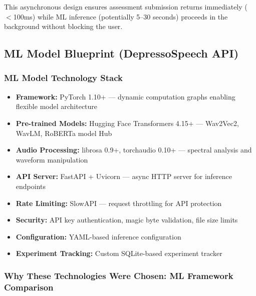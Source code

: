 \documentclass[12pt]{article}
\begin{document}
	This asynchronous design ensures assessment submission returns immediately ($<$100ms) while ML inference (potentially 5--30 seconds) proceeds in the background without blocking the user.


	\subsection{ML Model Blueprint (DepressoSpeech API)}

	\subsubsection{ML Model Technology Stack}

	\begin{itemize}
		\item \textbf{Framework:} PyTorch 1.10+ --- dynamic computation graphs enabling flexible model architecture
		\item \textbf{Pre-trained Models:} Hugging Face Transformers 4.15+ --- Wav2Vec2, WavLM, RoBERTa model Hub
		\item \textbf{Audio Processing:} librosa 0.9+, torchaudio 0.10+ --- spectral analysis and waveform manipulation
		\item \textbf{API Server:} FastAPI + Uvicorn --- async HTTP server for inference endpoints
		\item \textbf{Rate Limiting:} SlowAPI --- request throttling for API protection
		\item \textbf{Security:} API key authentication, magic byte validation, file size limits
		\item \textbf{Configuration:} YAML-based inference configuration
		\item \textbf{Experiment Tracking:} Custom SQLite-based experiment tracker
	\end{itemize}

	\subsubsection{Why These Technologies Were Chosen: ML Framework Comparison}
\end{document}
